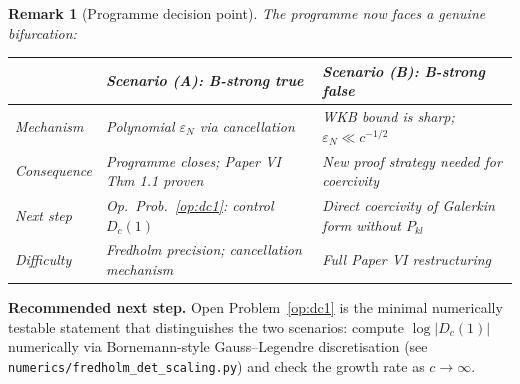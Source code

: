 \documentclass[12pt,a4paper]{article}
\newtheorem{remark}[theorem]{Remark}
\newcommand{\Dc}{D_c}
\begin{document}
\begin{remark}[Programme decision point]
\label{rem:decision}
The programme now faces a genuine bifurcation:
\begin{center}
\renewcommand{\arraystretch}{1.5}
\begin{tabular}{p{2.5cm} p{5cm} p{5cm}}
\toprule
& \textbf{Scenario (A): B-strong true}
& \textbf{Scenario (B): B-strong false} \\
\midrule
Mechanism
& Polynomial $\varepsilon_N$ via cancellation
& WKB bound is sharp; $\varepsilon_N \ll c^{-1/2}$ \\
Consequence
& Programme closes; Paper VI Thm 1.1 proven
& New proof strategy needed for coercivity \\
Next step
& Op.~Prob.~\ref{op:dc1}: control $D_c(1)$
& Direct coercivity of Galerkin form without $P_{kl}$ \\
Difficulty
& Fredholm precision; cancellation mechanism
& Full Paper VI restructuring \\
\bottomrule
\end{tabular}
\end{center}
\end{remark}

\medskip\noindent
\textbf{Recommended next step.}
Open Problem~\ref{op:dc1} is the minimal
numerically testable statement that distinguishes
the two scenarios:
compute $\log |\Dc(1)|$ numerically via
Bornemann-style Gauss--Legendre discretisation
(see \texttt{numerics/fredholm\_det\_scaling.py})
and check the growth rate as $c \to \infty$.
\end{document}
